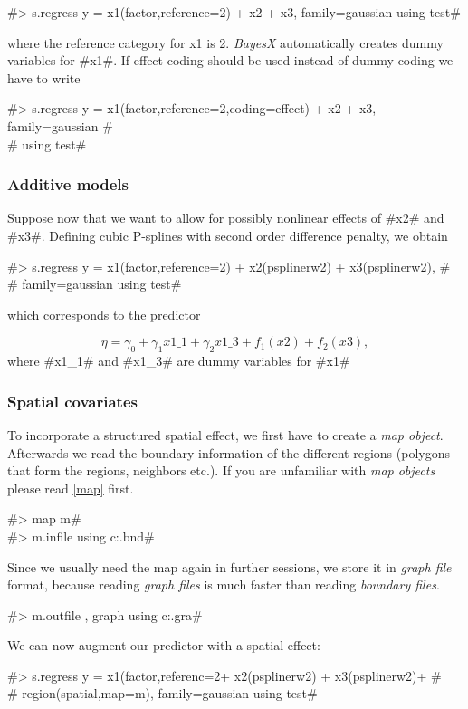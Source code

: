 #> s.regress y = x1(factor,reference=2) + x2 + x3, family=gaussian using test#

where the reference category for x1 is 2. {\em BayesX} automatically creates dummy variables for #x1#. If effect coding should be used instead of dummy coding
we have to write

#> s.regress y = x1(factor,reference=2,coding=effect) + x2 + x3, family=gaussian # \\
# using test#


\subsubsection*{Additive models}

Suppose now that we want to allow for possibly nonlinear effects
of #x2# and #x3#. Defining cubic P-splines with second order
difference penalty, we obtain

#> s.regress y = x1(factor,reference=2) + x2(psplinerw2) + x3(psplinerw2), # \\
# family=gaussian using test#

which corresponds to the predictor

$$
\eta = \gamma_0 + \gamma_1 x1\_1 + \gamma_2 x1\_3 + f_1(x2) + f_2(x3),
$$
where #x1_1# and #x1_3# are dummy variables for #x1#


\subsubsection*{Spatial covariates}

To incorporate a structured spatial effect, we first have to create a {\em
map object}. Afterwards we read the boundary information of
the different regions (polygons that form the regions, neighbors
etc.). If you are unfamiliar with {\em map objects} please read
\autoref{map} first.

#> map m# \\
#> m.infile using c:\maps\map.bnd#

Since we usually need the map again in further sessions, we store
it in {\em graph file} format, because reading {\em graph files}
is much faster than reading {\em boundary files}.

#> m.outfile , graph using c:\maps\mapgraph.gra#

We can now augment our predictor with a spatial effect:

 #> s.regress y = x1(factor,referenc=2+ x2(psplinerw2) + x3(psplinerw2)+ #\\
 #  region(spatial,map=m), family=gaussian using test#


